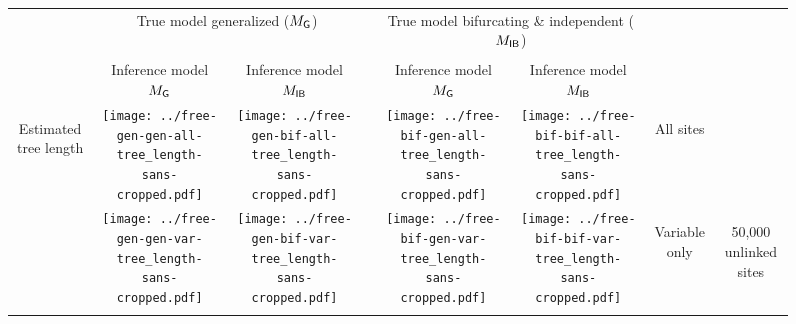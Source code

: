\documentclass[border=10pt,varwidth=30cm]{standalone}
\newcommand{\genmodel}{\ensuremath{M_{\textrm{\sffamily G}}}\xspace}
\newcommand{\bimodel}{\ensuremath{M_{\textrm{\sffamily IB}}}\xspace}
\begin{document}
\begin{figure}
    \setlength\arrayrulewidth{2pt}
    \centering
    \begin{tabular}{@{}cccccccc@{}}
        & \multicolumn{2}{c}{\LARGE True model generalized (\genmodel)}
        &
        & \multicolumn{2}{c}{\LARGE True model bifurcating \& independent (\bimodel)}
        &
        & \\[1ex]
        \cline{2-3}\cline{5-6}
        & & & & & & & \\
        & \multirow{1}{0.19\textwidth}{\centering\Large Inference model \genmodel}
        & \multirow{1}{0.19\textwidth}{\centering\Large Inference model \bimodel}
        &
        & \multirow{1}{0.19\textwidth}{\centering\Large Inference model \genmodel}
        & \multirow{1}{0.19\textwidth}{\centering\Large Inference model \bimodel}
        &
        & \\[4ex]
        \multirow{5}{*}[-8em]{\begin{sideways}\Large Estimated tree length\end{sideways}}
        & \texttt{[image: ../free-gen-gen-all-tree\_length-sans-cropped.pdf]}
        & \texttt{[image: ../free-gen-bif-all-tree\_length-sans-cropped.pdf]}
        &
        & \texttt{[image: ../free-bif-gen-all-tree\_length-sans-cropped.pdf]}
        & \texttt{[image: ../free-bif-bif-all-tree\_length-sans-cropped.pdf]}
        & \multicolumn{1}{c|}{\multirow{1}{*}[9em]{\begin{sideways}\Large All sites\end{sideways}}}
        & \\
        & \texttt{[image: ../free-gen-gen-var-tree\_length-sans-cropped.pdf]}
        & \texttt{[image: ../free-gen-bif-var-tree\_length-sans-cropped.pdf]}
        &
        & \texttt{[image: ../free-bif-gen-var-tree\_length-sans-cropped.pdf]}
        & \texttt{[image: ../free-bif-bif-var-tree\_length-sans-cropped.pdf]}
        & \multicolumn{1}{c|}{\multirow{1}{*}[10em]{\begin{sideways}\Large Variable only\end{sideways}}}
        & \multirow{2}{*}[19em]{\begin{sideways}\LARGE 50,000 unlinked sites\end{sideways}} \\
        & & & & & & & \\

\end{tabular}
\end{figure}
\end{document}
